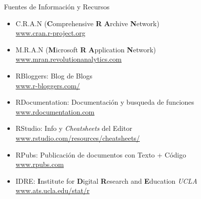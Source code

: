 \documentclass{IFFranciscoME}\usepackage[]{graphicx}\usepackage[]{color}
\begin{document}
\begin{frame}{Fuentes de Informaci\'on y Recursos}

\begin{itemize}

  \item C.R.A.N (\textbf{C}omprehensive \textbf{R} \textbf{A}rchive \textbf{N}etwork) \\
  \textcolor{blue}{ \href{https://cran.r-project.org}
  {www.cran.r-project.org}}
  
  \item M.R.A.N (\textbf{M}icrosoft \textbf{R} \textbf{A}pplication \textbf{N}etwork) \\
  \textcolor{blue}{\href{https://mran.revolutionanalytics.com}
  {www.mran.revolutionanalytics.com}}
  
  \item RBloggers: Blog de Blogs \\
  \textcolor{blue}{\href{http://www.r-bloggers.com/}
  {www.r-bloggers.com/}}

  \item RDocumentation: Documentaci\'on y busqueda de funciones \\
  \textcolor{blue}{\href{www.rdocumentation.com}{www.rdocumentation.com}}
  
  \item RStudio: Info y \textit{Cheatsheets} del Editor \\
  \textcolor{blue}{\href{https://www.rstudio.com/resources/cheatsheets/}
  {www.rstudio.com/resources/cheatsheets/}}
  
  \item RPubs: Publicaci\'on de documentos con Texto + C\'odigo \\
  \textcolor{blue}{\href{www.rpubs.com}
  {www.rpubs.com}}
  
  \item IDRE: \textbf{I}nstitute for \textbf{D}igital \textbf{R}esearch and 
  \textbf{E}ducation \textit{UCLA} \\ 
  \textcolor{blue}{\href{http://www.ats.ucla.edu/stat/r}
  {www.ats.ucla.edu/stat/r}}
  
\end{itemize}

\end{frame}

\end{document}
